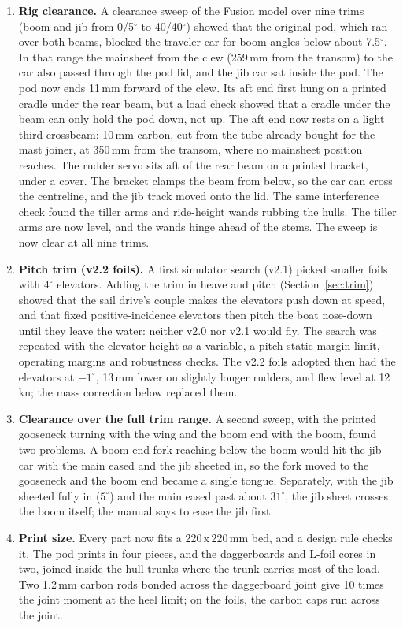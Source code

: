 \documentclass[10pt,twocolumn]{article}
\begin{document}
\begin{enumerate}
\item \textbf{Rig clearance.} A clearance sweep of the Fusion model over nine trims (boom and jib from 0/5$^\circ$ to 40/40$^\circ$) showed that the original pod, which ran over both beams, blocked the traveler car for boom angles below about 7.5$^\circ$. In that range the mainsheet from the clew (259\,mm from the transom) to the car also passed through the pod lid, and the jib car sat inside the pod. The pod now ends 11\,mm forward of the clew. Its aft end first hung on a printed cradle under the rear beam, but a load check showed that a cradle under the beam can only hold the pod down, not up. The aft end now rests on a light third crossbeam: 10\,mm carbon, cut from the tube already bought for the mast joiner, at 350\,mm from the transom, where no mainsheet position reaches. The rudder servo sits aft of the rear beam on a printed bracket, under a cover. The bracket clamps the beam from below, so the car can cross the centreline, and the jib track moved onto the lid. The same interference check found the tiller arms and ride-height wands rubbing the hulls. The tiller arms are now level, and the wands hinge ahead of the stems. The sweep is now clear at all nine trims.
\item \textbf{Pitch trim (v2.2 foils).} A first simulator search (v2.1) picked smaller foils with $4^\circ$ elevators. Adding the trim in heave and pitch (Section~\ref{sec:trim}) showed that the sail drive's couple makes the elevators push down at speed, and that fixed positive-incidence elevators then pitch the boat nose-down until they leave the water: neither v2.0 nor v2.1 would fly. The search was repeated with the elevator height as a variable, a pitch static-margin limit, operating margins and robustness checks. The v2.2 foils adopted then had the elevators at $-1^\circ$, 13\,mm lower on slightly longer rudders, and flew level at 12\,kn; the mass correction below replaced them.
\item \textbf{Clearance over the full trim range.} A second sweep, with the printed gooseneck turning with the wing and the boom end with the boom, found two problems. A boom-end fork reaching below the boom would hit the jib car with the main eased and the jib sheeted in, so the fork moved to the gooseneck and the boom end became a single tongue. Separately, with the jib sheeted fully in ($5^\circ$) and the main eased past about $31^\circ$, the jib sheet crosses the boom itself; the manual says to ease the jib first.
\item \textbf{Print size.} Every part now fits a 220\,x\,220\,mm bed, and a design rule checks it. The pod prints in four pieces, and the daggerboards and L-foil cores in two, joined inside the hull trunks where the trunk carries most of the load. Two 1.2\,mm carbon rods bonded across the daggerboard joint give 10 times the joint moment at the heel limit; on the foils, the carbon caps run across the joint.

\end{enumerate}
\end{document}
